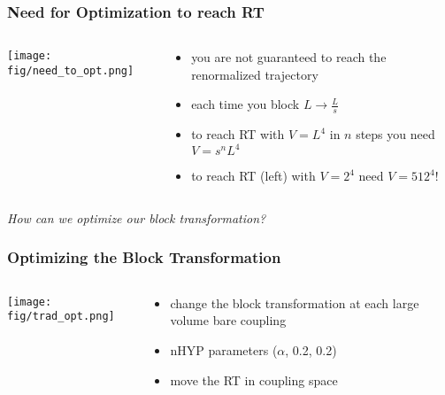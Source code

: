   \begin{frame}
    \frametitle{Need for Optimization to reach RT}
    \begin{columns}[T]
      \begin{column}{.5\textwidth}
        \begin{block}{}
          \texttt{[image: fig/need\_to\_opt.png]}
        \end{block}
      \end{column}
      \begin{column}{.5\textwidth}
        \begin{block}{}
          \begin{itemize}
            \item you are not guaranteed to reach the renormalized trajectory
            \item each time you block $L\rightarrow\frac{L}{s}$
            \item to reach RT with $V=L^4$ in $n$ steps you need $V=s^nL^{4}$
            \item to reach RT (left) with $V=2^4$ need $V=512^4$!
          \end{itemize}
        \end{block}
      \end{column}
    \end{columns}
  \begin{center}\emph{How can we optimize our block transformation?}\end{center}
  \end{frame}

  \begin{frame}
    \frametitle{Optimizing the Block Transformation}
    \begin{columns}[T]
      \begin{column}{.5\textwidth}
        \begin{block}{}
          \texttt{[image: fig/trad\_opt.png]}
        \end{block}
      \end{column}
      \begin{column}{.5\textwidth}
        \begin{block}{}
          \begin{itemize}
            \item change the block transformation at each large volume bare coupling
            \item nHYP parameters ($\alpha$, 0.2, 0.2)
            \item move the RT in coupling space
          \end{itemize}
        \end{block}
      \end{column}
    \end{columns}

  \end{frame}

